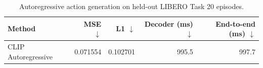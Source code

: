 \begin{table}[h]
\centering
\caption{Autoregressive action generation on held-out LIBERO Task 20 episodes.}
\label{tab:ar-task20}
\begin{tabular}{lrrrr}
\toprule
Method & MSE $\downarrow$ & L1 $\downarrow$ & Decoder (ms) $\downarrow$ & End-to-end (ms) $\downarrow$ \\
\midrule
CLIP Autoregressive & 0.071554 & 0.102701 & 995.5 & 997.7 \\
\bottomrule
\end{tabular}
\end{table}
